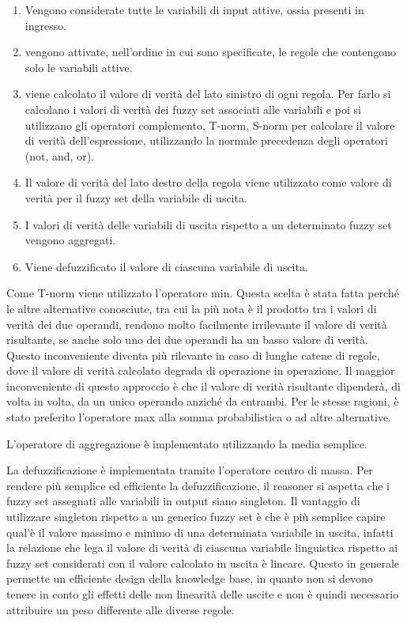 \begin{enumerate}
 \item Vengono considerate tutte le variabili di input attive, ossia presenti in ingresso.
 \item vengono attivate, nell'ordine in cui sono specificate, le regole che contengono solo le variabili attive.
 \item viene calcolato il valore di verità del lato sinistro di ogni regola. Per farlo si calcolano i valori di verità dei fuzzy set associati alle variabili e poi si utilizzano gli operatori complemento, T-norm, S-norm per calcolare il valore di verità dell'espressione, utilizzando la normale precedenza degli operatori (not, and, or).
 \item Il valore di verità del lato destro della regola viene utilizzato come valore di verità per il fuzzy set della variabile di uscita.
 \item I valori di verità delle variabili di uscita rispetto a un determinato fuzzy set vengono aggregati.
 \item Viene defuzzificato il valore di ciascuna variabile di uscita. 
\end{enumerate}

Come T-norm viene utilizzato l'operatore min. Questa scelta è stata fatta perché le altre alternative conosciute, tra cui la più nota è il prodotto tra i valori di verità dei due operandi, rendono molto facilmente irrilevante il valore di verità risultante, se anche solo uno dei due operandi ha un basso valore di verità. Questo inconveniente diventa più rilevante in caso di lunghe catene di regole, dove il valore di verità calcolato degrada di operazione in operazione. Il maggior inconveniente di questo approccio è che il valore di verità risultante dipenderà, di volta in volta, da un unico operando anziché da entrambi.
Per le stesse ragioni, è stato preferito l'operatore max alla somma probabilistica o ad altre alternative.

L'operatore di aggregazione è implementato utilizzando la media semplice.

La defuzzificazione è implementata tramite l'operatore centro di massa. Per rendere più semplice ed efficiente la defuzzificazione, il reasoner si aspetta che i fuzzy set assegnati alle variabili in output siano singleton. Il vantaggio di utilizzare singleton rispetto a un generico fuzzy set è che è più semplice capire qual'è il valore massimo e minimo di una determinata variabile in uscita, infatti la relazione che lega il valore di verità di ciascuna variabile linguistica rispetto ai fuzzy set considerati con il valore calcolato in uscita è lineare. Questo in generale permette un efficiente design della knowledge base, in quanto non si devono tenere in conto gli effetti delle non linearità delle uscite e non è quindi necessario attribuire un peso differente alle diverse regole.

